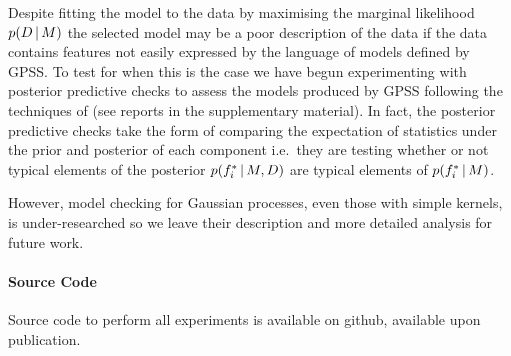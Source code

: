 \documentclass{article}
\def\ie{i.e.\ }
\begin{document}
Despite fitting the model to the data by maximising the marginal likelihood $p(D\,|\, M)$ the selected model may be a poor description of the data if the data contains features not easily expressed by the language of models defined by GPSS.
To test for when this is the case we have begun experimenting with posterior predictive checks to assess the models produced by GPSS following the techniques of \cite{Gelman1996} (see reports in the supplementary material).
In fact, the posterior predictive checks take the form of comparing the expectation of statistics under the prior and posterior of each component \ie they are testing whether or not typical elements of the posterior $p(f_i^*\,|\, M,D)$ are typical elements of $p(f_i^*\,|\, M)$.

However, model checking for Gaussian processes, even those with simple kernels, is under-researched so we leave their description and more detailed analysis for future work.

\paragraph{Source Code}
Source code to perform all experiments is available on github, available upon publication.







\end{document}
